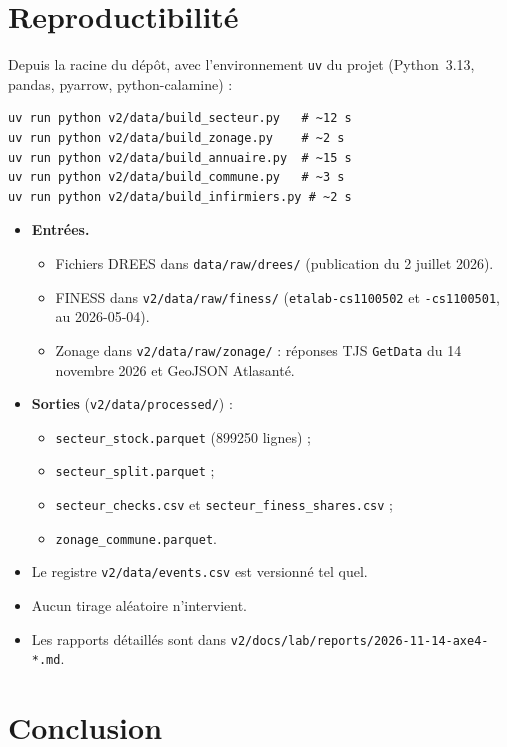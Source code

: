 \section{Reproductibilité}
Depuis la racine du dépôt, avec l'environnement \texttt{uv} du projet (Python~3.13, pandas, pyarrow,
python-calamine) :
\begin{verbatim}
uv run python v2/data/build_secteur.py   # ~12 s
uv run python v2/data/build_zonage.py    # ~2 s
uv run python v2/data/build_annuaire.py  # ~15 s
uv run python v2/data/build_commune.py   # ~3 s
uv run python v2/data/build_infirmiers.py # ~2 s
\end{verbatim}
\begin{itemize}
  \item \textbf{Entrées.}
  \begin{itemize}
    \item Fichiers DREES dans \texttt{data/raw/drees/} (publication du 2 juillet 2026).
    \item FINESS dans \texttt{v2/data/raw/finess/} (\texttt{etalab-cs1100502} et \texttt{-cs1100501}, au
    2026-05-04).
    \item Zonage dans \texttt{v2/data/raw/zonage/} : réponses TJS \texttt{GetData} du 14 novembre 2026 et GeoJSON
    Atlasanté.
  \end{itemize}
  \item \textbf{Sorties} (\texttt{v2/data/processed/}) :
  \begin{itemize}
    \item \texttt{secteur\_stock.parquet} (\num{899250} lignes) ;
    \item \texttt{secteur\_split.parquet} ;
    \item \texttt{secteur\_checks.csv} et \texttt{secteur\_finess\_shares.csv} ;
    \item \texttt{zonage\_commune.parquet}.
  \end{itemize}
  \item Le registre \texttt{v2/data/events.csv} est versionné tel quel.
  \item Aucun tirage aléatoire n'intervient.
  \item Les rapports détaillés sont dans \texttt{v2/docs/lab/reports/2026-11-14-axe4-*.md}.
\end{itemize}

\section{Conclusion}
